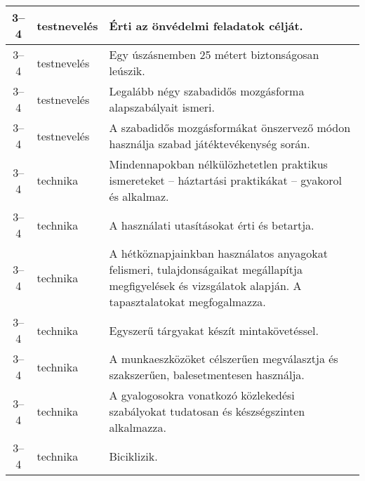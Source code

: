\begin{small}
\begin{longtable}{c | p{2cm} |  p{11cm} }
              3--4 & testnevelés & Érti az önvédelmi feladatok célját. \\ \hline
              3--4 & testnevelés & Egy úszásnemben 25 métert biztonságosan leúszik. \\ \hline
              3--4 & testnevelés & Legalább négy szabadidős mozgásforma alapszabályait ismeri. \\ \hline
              3--4 & testnevelés & A szabadidős mozgásformákat önszervező módon használja szabad játéktevékenység során. \\ \hline
              3--4 & technika & Mindennapokban nélkülözhetetlen praktikus ismereteket – háztartási praktikákat – gyakorol és alkalmaz. \\ \hline
              3--4 & technika & A használati utasításokat érti és betartja. \\ \hline
              3--4 & technika & A hétköznapjainkban használatos anyagokat felismeri, tulajdonságaikat megállapítja megfigyelések és vizsgálatok alapján. A tapasztalatokat megfogalmazza. \\ \hline
              3--4 & technika & Egyszerű tárgyakat készít mintakövetéssel. \\ \hline
              3--4 & technika & A munkaeszközöket célszerűen megválasztja és szakszerűen, balesetmentesen használja. \\ \hline
              3--4 & technika & A gyalogosokra vonatkozó közlekedési szabályokat tudatosan és készségszinten alkalmazza. \\ \hline
              3--4 & technika & Biciklizik. \\ \hline
      \end{longtable}
\end{small}


